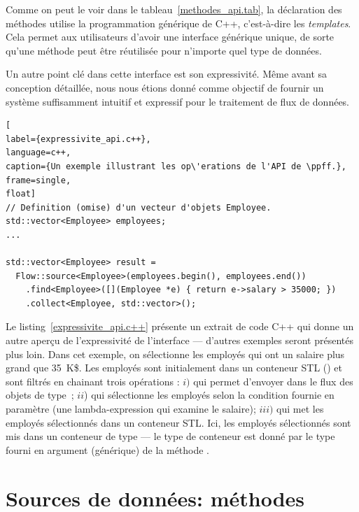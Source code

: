 \newpage
{}
\recalctypearea


Comme on peut le voir dans le tableau~\ref{methodes_api.tab}, la d\'eclaration des m\'ethodes utilise la programmation g\'en\'erique de C++, c'est-\`a-dire les \emph{templates}. Cela permet aux utilisateurs d'avoir une interface g\'en\'erique unique, de sorte qu'une m\'ethode peut \^etre r\'eutilis\'ee pour n'importe quel type de donn\'ees.


Un autre point cl\'e dans cette interface est son expressivit\'e. M\^eme avant sa conception d\'etaill\'ee, nous nous \'etions donn\'e comme objectif de fournir un syst\`eme suffisamment intuitif et expressif pour le traitement de flux de donn\'ees.


\begin{lstlisting}[
label={expressivite_api.c++},
language=c++,
caption={Un exemple illustrant les op\'erations de l'API de \ppff.},
frame=single,
float]
// Definition (omise) d'un vecteur d'objets Employee.
std::vector<Employee> employees;
...

std::vector<Employee> result = 
  Flow::source<Employee>(employees.begin(), employees.end())
    .find<Employee>([](Employee *e) { return e->salary > 35000; })
    .collect<Employee, std::vector>();
\end{lstlisting}


Le listing~\ref{expressivite_api.c++} pr\'esente un extrait de code C++ qui donne un autre aper\c{c}u de l'expressivit\'e de l'interface --- d'autres exemples seront pr\'esent\'es plus loin. Dans cet exemple, on s\'electionne les employ\'es qui ont un salaire plus grand que 35~K\$. Les employ\'es sont initialement dans un conteneur STL () et sont filtr\'es en chainant trois op\'erations : $i)$  qui permet d'envoyer dans le flux des objets de type~; $ii$)  qui s\'electionne les employ\'es selon la condition fournie en param\`etre (une lambda-expression qui examine le salaire); $iii)$  qui met les employ\'es s\'electionn\'es dans un conteneur STL. Ici, les employ\'es s\'electionn\'es sont mis dans un conteneur de type  --- le type de conteneur est donn\'e par le type fourni en argument (g\'en\'erique) de la m\'ethode .
 





\section{Sources de donn\'ees: m\'ethodes }


